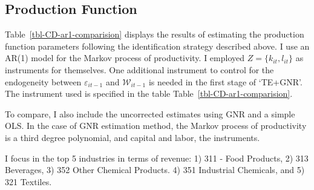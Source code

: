 \documentclass[
  12pt]{article}
\theoremstyle{definition}
\theoremstyle{remark}
\begin{document}
\subsection{Production Function}\label{production-function}

Table~\ref{tbl-CD-ar1-comparision} displays the results of estimating
the production function parameters following the identification strategy
described above. I use an AR(1) model for the Markov process of
productivity. I employed \(Z=\{k_{it},l_{it}\}\) as instruments for
themselves. One additional instrument to control for the endogeneity
between \(\varepsilon_{it-1}\) and \(\mathcal{W}_{it-1}\) is needed in
the first stage of `TE+GNR'. The instrument used is specified in the
table Table~\ref{tbl-CD-ar1-comparision}.

To compare, I also include the uncorrected estimates using GNR and a
simple OLS. In the case of GNR estimation method, the Markov process of
productivity is a third degree polynomial, and capital and labor, the
instruments.

I focus in the top 5 industries in terms of revenue: 1) 311 - Food
Products, 2) 313 Beverages, 3) 352 Other Chemical Products. 4) 351
Industrial Chemicals, and 5) 321 Textiles.
\end{document}
